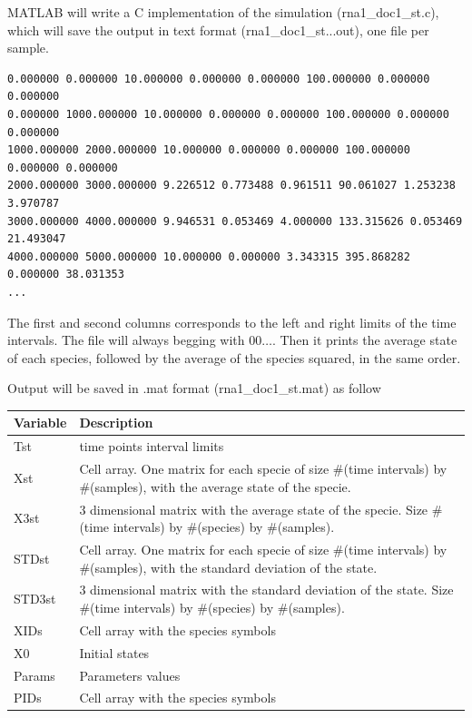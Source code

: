 \documentclass[letterpaper]{article}
\begin{document}
MATLAB will write a C implementation of the simulation
(\textsf{rna1\_doc1\_st.c}), which will save the output in text format
(\textsf{rna1\_doc1\_st...out}), one file per sample. 
{\footnotesize
\begin{verbatim}
0.000000 0.000000 10.000000 0.000000 0.000000 100.000000 0.000000 0.000000
0.000000 1000.000000 10.000000 0.000000 0.000000 100.000000 0.000000 0.000000
1000.000000 2000.000000 10.000000 0.000000 0.000000 100.000000 0.000000 0.000000
2000.000000 3000.000000 9.226512 0.773488 0.961511 90.061027 1.253238 3.970787
3000.000000 4000.000000 9.946531 0.053469 4.000000 133.315626 0.053469 21.493047
4000.000000 5000.000000 10.000000 0.000000 3.343315 395.868282 0.000000 38.031353
...
\end{verbatim}
}
The first and second columns corresponds to the left and right limits
of the time intervals. The file will always begging with $0 0
\ldots$. Then it prints the average state of each species, followed by
the average of the species squared, in the same order. 

Output will be saved in \textsf{.mat} format
(\textsf{rna1\_doc1\_st.mat}) as follow \\
\begin{tabular}{|p{1.5cm}|p{9cm}|} 
  \hline
  Variable & Description \\
  \hline
  Tst & time points interval limits \\
  Xst & Cell array. One matrix for each specie of size \#(time
  intervals) by \#(samples), with the average state of the specie. \\
  X3st & 3 dimensional matrix with the average state of the specie. Size
  \#(time intervals) by \#(species) by \#(samples). \\
  STDst & Cell array. One matrix for each specie of size \#(time
  intervals) by \#(samples), with the standard deviation of the
  state. \\
  STD3st & 3 dimensional matrix with the standard deviation of the
  state. Size \#(time intervals) by \#(species) by \#(samples). \\
  XIDs & Cell array with the species symbols \\
  X0 & Initial states \\
  Params & Parameters values \\
  PIDs & Cell array with the species symbols \\
  \hline
\end{tabular}\\ 
\end{document}
